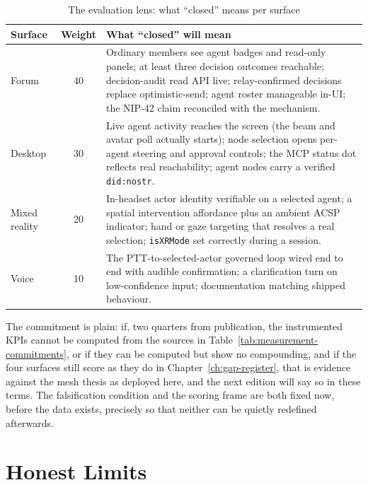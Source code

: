 \begin{table}[h]
\centering
\caption{The evaluation lens: what ``closed'' means per surface}
\label{tab:evaluation-lens}
\begin{tabularx}{\textwidth}{L{2.6cm} c X}
\toprule
\textbf{Surface} & \textbf{Weight} & \textbf{What ``closed'' will mean} \\
\midrule
Forum & 40 & Ordinary members see agent badges and read-only panels; at least three decision outcomes reachable; decision-audit read API live; relay-confirmed decisions replace optimistic-send; agent roster manageable in-UI; the NIP-42 claim reconciled with the mechanism. \\
\addlinespace
Desktop & 30 & Live agent activity reaches the screen (the beam and avatar poll actually starts); node selection opens per-agent steering and approval controls; the MCP status dot reflects real reachability; agent nodes carry a verified \texttt{did:nostr}. \\
\addlinespace
Mixed reality & 20 & In-headset actor identity verifiable on a selected agent; a spatial intervention affordance plus an ambient ACSP indicator; hand or gaze targeting that resolves a real selection; \texttt{isXRMode} set correctly during a session. \\
\addlinespace
Voice & 10 & The PTT-to-selected-actor governed loop wired end to end with audible confirmation; a clarification turn on low-confidence input; documentation matching shipped behaviour. \\
\bottomrule
\end{tabularx}
\end{table}

The commitment is plain: if, two quarters from publication, the instrumented KPIs cannot be computed from the sources in Table~\ref{tab:measurement-commitments}, or if they can be computed but show no compounding, and if the four surfaces still score as they do in Chapter~\ref{ch:gap-register}, that is evidence against the mesh thesis as deployed here, and the next edition will say so in these terms. The falsification condition and the scoring frame are both fixed now, before the data exists, precisely so that neither can be quietly redefined afterwards.

\section{Honest Limits}

